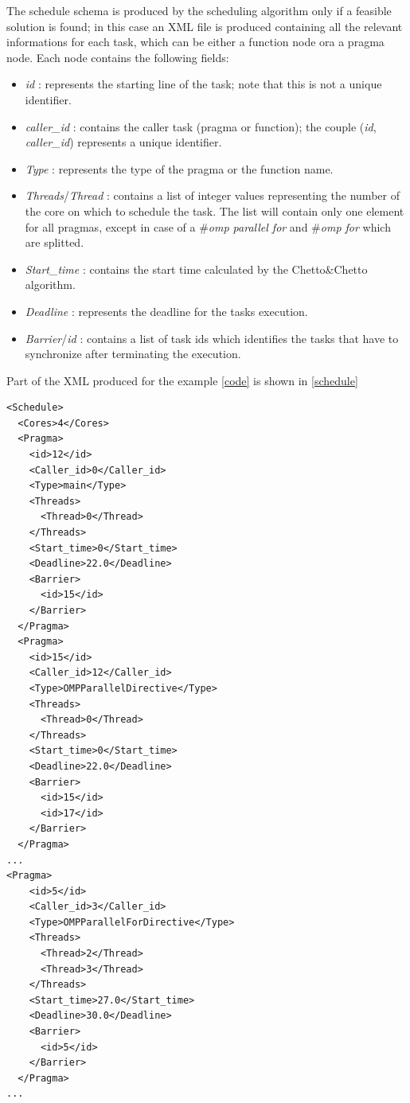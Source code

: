 \documentclass[a4paper,12pt,oneside]{book}
\begin{document}
The schedule schema is produced by the scheduling algorithm only if a feasible solution is found; in this case an XML file is produced containing all the relevant informations for each task, which can be either a function node ora a pragma node. Each node contains the following fields:
\begin{itemize}
\item{\emph{id} : represents the starting line of the task; note that this is not a unique identifier.}
\item{\emph{caller\_id} : contains the caller task (pragma or function); the couple (\emph{id}, \emph{caller\_id}) represents a unique identifier.}
\item{\emph{Type} : represents the type of the pragma or the function name. }
\item{\emph{Threads}/\emph{Thread} : contains a list of integer values representing the number of the core on which to schedule the task. The list will contain only one element for all pragmas, except in case of a \emph{$\#$omp parallel for} and \emph{$\#$omp for} which are splitted.}
\item{\emph{Start\_time} : contains the start time calculated by the Chetto\&Chetto algorithm.}
\item{\emph{Deadline} : represents the deadline for the tasks execution.}
\item{\emph{Barrier}/\emph{id} : contains a list of task ids which identifies the tasks that have to synchronize after terminating the execution.}
\end{itemize}
Part of the XML produced for the example \ref{code} is shown  in \ref{schedule}

\lstset{language=XML}
\begin{lstlisting}[caption=Schedule XML, label=schedule]
<Schedule>
  <Cores>4</Cores>
  <Pragma>
    <id>12</id>
    <Caller_id>0</Caller_id>
    <Type>main</Type>
    <Threads>
      <Thread>0</Thread>
    </Threads>
    <Start_time>0</Start_time>
    <Deadline>22.0</Deadline>
    <Barrier>
      <id>15</id>
    </Barrier>
  </Pragma>
  <Pragma>
    <id>15</id>
    <Caller_id>12</Caller_id>
    <Type>OMPParallelDirective</Type>
    <Threads>
      <Thread>0</Thread>
    </Threads>
    <Start_time>0</Start_time>
    <Deadline>22.0</Deadline>
    <Barrier>
      <id>15</id>
      <id>17</id>
    </Barrier>
  </Pragma>
...
<Pragma>
    <id>5</id>
    <Caller_id>3</Caller_id>
    <Type>OMPParallelForDirective</Type>
    <Threads>
      <Thread>2</Thread>
      <Thread>3</Thread>
    </Threads>
    <Start_time>27.0</Start_time>
    <Deadline>30.0</Deadline>
    <Barrier>
      <id>5</id>
    </Barrier>
  </Pragma>
...

\end{lstlisting}
\end{document}
